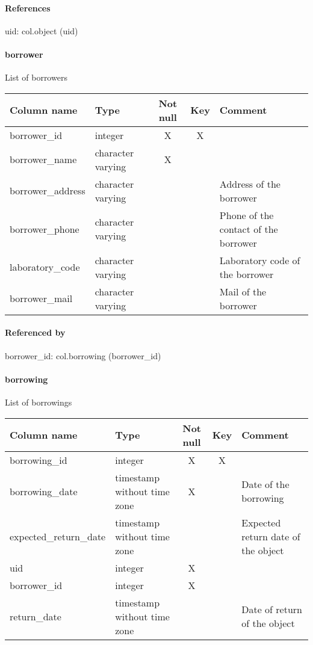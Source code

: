 \paragraph{References}
uid: col.object (uid)

\paragraph{borrower}
List of borrowers

\begin{tabular}{|l| p{2cm}|c|c| p{5cm}|}
\hline
Column name & Type & Not null & Key & Comment \\
\hline
borrower\_id & integer & X & X & \\
borrower\_name & character varying & X &  & \\
borrower\_address & character varying &  &  & Address of the borrower\\
borrower\_phone & character varying &  &  & Phone of the contact of the borrower\\
laboratory\_code & character varying &  &  & Laboratory code of the borrower\\
borrower\_mail & character varying &  &  & Mail of the borrower\\
\hline
\end{tabular}
\paragraph{Referenced by}
borrower\_id: col.borrowing (borrower\_id)

\paragraph{borrowing}
List of borrowings

\begin{tabular}{|l| p{2cm}|c|c| p{5cm}|}
\hline
Column name & Type & Not null & Key & Comment \\
\hline
borrowing\_id & integer & X & X & \\
borrowing\_date & timestamp without time zone & X &  & Date of the borrowing\\
expected\_return\_date & timestamp without time zone &  &  & Expected return date of the object\\
uid & integer & X &  & \\
borrower\_id & integer & X &  & \\
return\_date & timestamp without time zone &  &  & Date of return of the object\\
\hline
\end{tabular}
